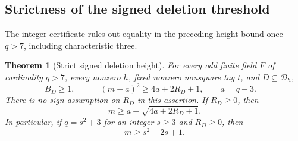 \documentclass[11pt]{article}
\newtheorem{theorem}{Theorem}[section]
\begin{document}
\subsection{Strictness of the signed deletion threshold}
The integer certificate rules out equality in the preceding height
bound once \(q>7\), including characteristic three.

\begin{theorem}[Strict signed deletion height]
\label{thm:tripleDeletionStrict}
For every odd finite field \(F\) of cardinality \(q>7\), every
nonzero \(h\), fixed nonzero nonsquare tag \(t\), and
\(D\subseteq\mathcal D_h\),
\[
 B_D\ge1,\qquad
 \boxed{\quad (m-a)^2\ge4a+2R_D+1,\qquad a=q-3.\quad} \tag{SD}
\]
There is no sign assumption on \(R_D\) in this assertion.
If \(R_D\ge0\), then
\[
 \boxed{\quad m\ge a+\sqrt{4a+2R_D+1}.\quad} \tag{SH}
\]
In particular, if \(q=s^2+3\) for an integer \(s\ge3\) and
\(R_D\ge0\), then
\[
                 m\ge s^2+2s+1. \tag{SS}
\]
\end{theorem}
\end{document}
